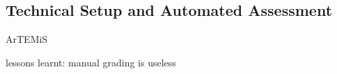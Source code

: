 \subsection{Technical Setup and Automated Assessment}\label{sec:tech_setup_test}

ArTEMiS \citep{artemis}

lessons learnt: manual grading is useless
